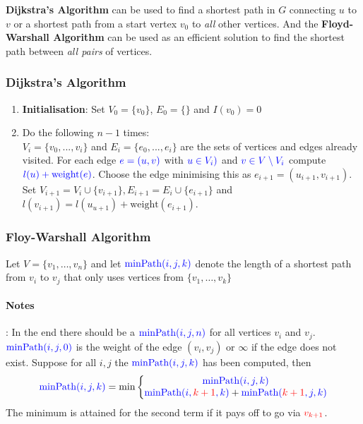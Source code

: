\documentclass[11pt]{article}
\begin{document}
\textbf{Dijkstra's Algorithm} can be used to find a shortest path in $G$ connecting $u$ to $v$ or a shortest path from a start vertex $v_0$ to \emph{all} other vertices. And the \textbf{Floyd-Warshall Algorithm} can be used as an efficient solution to find the shortest path between \emph{all pairs} of vertices.

\subsubsection{Dijkstra's Algorithm}
\begin{enumerate}
	\item \textbf{Initialisation}: Set $V_0 = \{v_0\}$, $E_0 = \{\}$ and $I(v_0) = 0$
	\item Do the following $n-1$ times:\\
	$V_i = \{v_0, ..., v_i\}$ and $E_i = \{e_0, ..., e_i\}$ are the sets of vertices and edges already visited. For each edge ${\color{Blue1} e = (u,v)}$ with ${\color{Blue1} u\in V_i)}$ and ${\color{Blue1} v\in V\setminus V_i}$ compute ${\color{Blue1} l(u) + \text{weight}(e)}$. Choose the edge minimising this as $e_{i+1} = (u_{i+1}, v_{i+1})$.\\
	Set $V_{i+1} = V_i \cup \{v_{i+1}\}, E_{i+1} = E_i \cup \{e_{i+1}\}$ and $l(v_{i+1}) = l(u_{u+1}) + \text{weight}(e_{i+1})$.
\end{enumerate}

\subsubsection{Floy-Warshall Algorithm}

Let $V = \{v_1,\dots,v_n\}$ and let ${\color{Blue1} \text{minPath}(i,j,k)}$ denote the length of a shortest path from $v_i$ to $v_j$ that only uses vertices from $\{v_1, \dots, v_k\}$

\paragraph{Notes}: In the end there should be a ${\color{Blue1}\text{minPath}(i,j,n)}$ for all vertices $v_i$ and $v_j$. ${\color{Blue1}\text{minPath}(i,j,0)}$ is the weight of the edge $(v_i,v_j)$ or $\infty$ if the edge does not exist. Suppose for all $i,j$ the ${\color{Blue1}\text{minPath}(i,j,k)}$ has been computed, then
\begin{equation*}
	{\color{Blue1}\text{minPath}(i,j,k)} = \min\left\{ \begin{matrix}
	{\color{Blue1}\text{minPath}(i,j,k)}\\
	{\color{Blue1}\text{minPath}(i,{\color{Red1}k+1},k)} + {\color{Blue1}\text{minPath}({\color{Red1}k+1},j,k)}
	\end{matrix} \right.
\end{equation*}
The minimum is attained for the second term if it pays off to go via ${\color{Red1}v_{k+1}}$.
\end{document}
